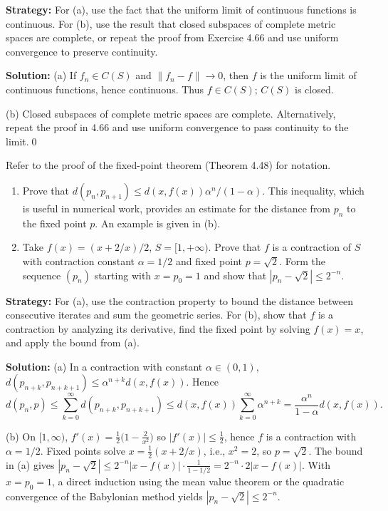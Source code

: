 \noindent\textbf{Strategy:} For (a), use the fact that the uniform limit of continuous functions is continuous. For (b), use the result that closed subspaces of complete metric spaces are complete, or repeat the proof from Exercise 4.66 and use uniform convergence to preserve continuity.

\bigskip\noindent\textbf{Solution:}
(a) If $f_n\in C(S)$ and $\|f_n-f\|\to 0$, then $f$ is the uniform limit of continuous functions, hence continuous. Thus $f\in C(S)$; $C(S)$ is closed.

(b) Closed subspaces of complete metric spaces are complete. Alternatively, repeat the proof in 4.66 and use uniform convergence to pass continuity to the limit.\qed



\begin{problembox}
\begin{problemstatement}
Refer to the proof of the fixed-point theorem (Theorem 4.48) for notation.
\begin{enumerate}[label=(\alph*)]
\item Prove that $d(p_n, p_{n+1}) \leq d(x, f(x)) \alpha^n / (1 - \alpha)$. This inequality, which is useful in numerical work, provides an estimate for the distance from $p_n$ to the fixed point $p$. An example is given in (b).
\item Take $f(x) = (x + 2/x)/2$, $S = [1, +\infty)$. Prove that $f$ is a contraction of $S$ with contraction constant $\alpha = 1/2$ and fixed point $p = \sqrt{2}$. Form the sequence $(p_n)$ starting with $x=p_0=1$ and show that $|p_n - \sqrt{2}| \le 2^{-n}$.
\end{enumerate}
\end{problemstatement}
\end{problembox}

\noindent\textbf{Strategy:} For (a), use the contraction property to bound the distance between consecutive iterates and sum the geometric series. For (b), show that $f$ is a contraction by analyzing its derivative, find the fixed point by solving $f(x) = x$, and apply the bound from (a).

\bigskip\noindent\textbf{Solution:}
(a) In a contraction with constant $\alpha\in(0,1)$, $d(p_{n+k},p_{n+k+1})\le \alpha^{n+k}d(x,f(x))$. Hence
\[
d(p_n,p)\le \sum_{k=0}^{\infty} d(p_{n+k},p_{n+k+1})\le d(x,f(x))\sum_{k=0}^{\infty}\alpha^{n+k}=\frac{\alpha^n}{1-\alpha}d(x,f(x)).
\]

(b) On $[1,\infty)$, $f'(x)=\tfrac12\big(1-\tfrac{2}{x^2}\big)$ so $|f'(x)|\le \tfrac12$, hence $f$ is a contraction with $\alpha=1/2$. Fixed points solve $x=\tfrac12(x+2/x)$, i.e., $x^2=2$, so $p=\sqrt2$. The bound in (a) gives $|p_n-\sqrt2|\le 2^{-n}|x-f(x)|\cdot\tfrac{1}{1-1/2}=2^{-n}\cdot 2|x-f(x)|$. With $x=p_0=1$, a direct induction using the mean value theorem or the quadratic convergence of the Babylonian method yields $|p_n-\sqrt2|\le 2^{-n}$.

